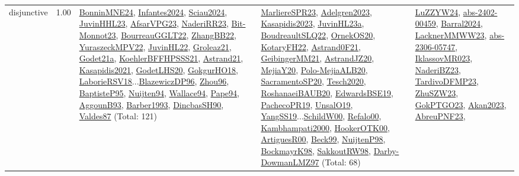 {\begin{longtable}{p{3cm}r>{\raggedright\arraybackslash}p{6cm}>{\raggedright\arraybackslash}p{6cm}>{\raggedright\arraybackslash}p{8cm}}
\index{disjunctive}\index{Constraints!disjunctive}disjunctive &  1.00 & \hyperref[detail:BonninMNE24]{BonninMNE24}, \hyperref[detail:Infantes2024]{Infantes2024}, \hyperref[detail:Sciau2024]{Sciau2024}, \hyperref[detail:JuvinHHL23]{JuvinHHL23}, \hyperref[detail:AfsarVPG23]{AfsarVPG23}, \hyperref[detail:NaderiRR23]{NaderiRR23}, \hyperref[detail:Bit-Monnot23]{Bit-Monnot23}, \hyperref[detail:BourreauGGLT22]{BourreauGGLT22}, \hyperref[detail:ZhangBB22]{ZhangBB22}, \hyperref[detail:YuraszeckMPV22]{YuraszeckMPV22}, \hyperref[detail:JuvinHL22]{JuvinHL22}, \hyperref[detail:Groleaz21]{Groleaz21}, \hyperref[detail:Godet21a]{Godet21a}, \hyperref[detail:KoehlerBFFHPSSS21]{KoehlerBFFHPSSS21}, \hyperref[detail:Astrand21]{Astrand21}, \hyperref[detail:Kasapidis2021]{Kasapidis2021}, \hyperref[detail:GodetLHS20]{GodetLHS20}, \hyperref[detail:GokgurHO18]{GokgurHO18}, \hyperref[detail:LaborieRSV18]{LaborieRSV18}...\hyperref[detail:BlazewiczDP96]{BlazewiczDP96}, \hyperref[detail:Zhou96]{Zhou96}, \hyperref[detail:BaptisteP95]{BaptisteP95}, \hyperref[detail:Nuijten94]{Nuijten94}, \hyperref[detail:Wallace94]{Wallace94}, \hyperref[detail:Pape94]{Pape94}, \hyperref[detail:AggounB93]{AggounB93}, \hyperref[detail:Barber1993]{Barber1993}, \hyperref[detail:DincbasSH90]{DincbasSH90}, \hyperref[detail:Valdes87]{Valdes87} (Total: 121) & \hyperref[detail:MarliereSPR23]{MarliereSPR23}, \hyperref[detail:Adelgren2023]{Adelgren2023}, \hyperref[detail:Kasapidis2023]{Kasapidis2023}, \hyperref[detail:JuvinHL23a]{JuvinHL23a}, \hyperref[detail:BoudreaultSLQ22]{BoudreaultSLQ22}, \hyperref[detail:OrnekOS20]{OrnekOS20}, \hyperref[detail:KotaryFH22]{KotaryFH22}, \hyperref[detail:Astrand0F21]{Astrand0F21}, \hyperref[detail:GeibingerMM21]{GeibingerMM21}, \hyperref[detail:AstrandJZ20]{AstrandJZ20}, \hyperref[detail:MejiaY20]{MejiaY20}, \hyperref[detail:Polo-MejiaALB20]{Polo-MejiaALB20}, \hyperref[detail:SacramentoSP20]{SacramentoSP20}, \hyperref[detail:Tesch2020]{Tesch2020}, \hyperref[detail:RoshanaeiBAUB20]{RoshanaeiBAUB20}, \hyperref[detail:EdwardsBSE19]{EdwardsBSE19}, \hyperref[detail:PachecoPR19]{PachecoPR19}, \hyperref[detail:UnsalO19]{UnsalO19}, \hyperref[detail:YangSS19]{YangSS19}...\hyperref[detail:SchildW00]{SchildW00}, \hyperref[detail:Refalo00]{Refalo00}, \hyperref[detail:Kambhampati2000]{Kambhampati2000}, \hyperref[detail:HookerOTK00]{HookerOTK00}, \hyperref[detail:ArtiguesR00]{ArtiguesR00}, \hyperref[detail:Beck99]{Beck99}, \hyperref[detail:NuijtenP98]{NuijtenP98}, \hyperref[detail:BockmayrK98]{BockmayrK98}, \hyperref[detail:SakkoutRW98]{SakkoutRW98}, \hyperref[detail:Darby-DowmanLMZ97]{Darby-DowmanLMZ97} (Total: 68) & \hyperref[detail:LuZZYW24]{LuZZYW24}, \hyperref[detail:abs-2402-00459]{abs-2402-00459}, \hyperref[detail:Barral2024]{Barral2024}, \hyperref[detail:LacknerMMWW23]{LacknerMMWW23}, \hyperref[detail:abs-2306-05747]{abs-2306-05747}, \hyperref[detail:IklassovMR023]{IklassovMR023}, \hyperref[detail:NaderiBZ23]{NaderiBZ23}, \hyperref[detail:TardivoDFMP23]{TardivoDFMP23}, \hyperref[detail:ZhuSZW23]{ZhuSZW23}, \hyperref[detail:GokPTGO23]{GokPTGO23}, \hyperref[detail:Akan2023]{Akan2023}, \hyperref[detail:AbreuPNF23]{AbreuPNF23}, 
\end{longtable}}
